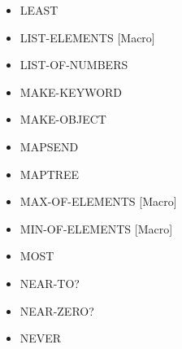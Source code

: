 \documentclass [11pt]{book}
\begin{document}
\begin{itemize}
\item {}LEAST





\item {}LIST-ELEMENTS [Macro]





\item {}LIST-OF-NUMBERS





\item {}MAKE-KEYWORD





\item {}MAKE-OBJECT





\item {}MAPSEND





\item {}MAPTREE





\item {}MAX-OF-ELEMENTS [Macro]





\item {}MIN-OF-ELEMENTS [Macro]





\item {}MOST





\item {}NEAR-TO?





\item {}NEAR-ZERO?





\item {}NEVER






\end{itemize}
\end{document}

